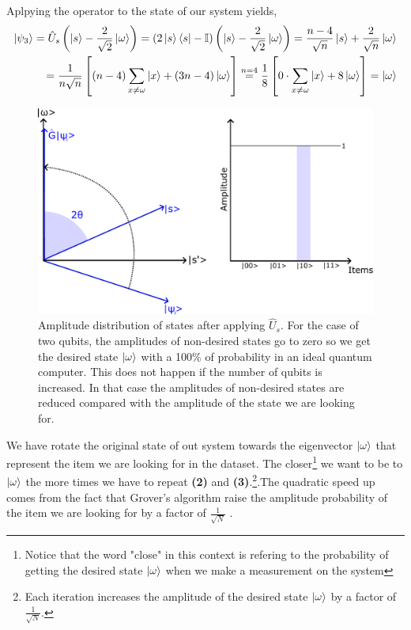 Aplpying the operator to the state of our system yields,
\begin{align*}
    \ket{\psi_{3}} = \hat{U}_{s}\left(\ket{s} -\frac{2}{\sqrt{2}}\ket{\omega}\right) = \left(2\ket{s}\bra{s} - \mathbb{I}\right)\left(\ket{s} - \frac{2}{\sqrt{2}}\ket{\omega}\right) = \frac{n - 4}{\sqrt{n}}\ket{s} + \frac{2}{\sqrt{n}}\ket{\omega} \\
    = \frac{1}{n\sqrt{n}} \left[\left(n - 4\right)\sum_{x\neq \omega}\ket{x} + \left(3n-4\right)\ket{\omega}\right] \overset{n=4}{=} \frac{1}{8} \left[0 \cdot \sum_{x\neq \omega}\ket{x} + 8\ket{\omega}\right] = \ket{\omega}
\end{align*}
\begin{figure}[H]
    \centering
    \includegraphics[scale=0.55]{Figures/Grover_Step3.pdf}
    \caption{Amplitude distribution of states after applying $\hat{U}_{s}$. For the case of two qubits, the amplitudes of non-desired states go to zero so we get the desired state $\ket{\omega}$ with a 100\% of probability in an ideal quantum computer. This does not happen if the number of qubits is increased. In that case the amplitudes of non-desired states are reduced compared with the amplitude of the state we are looking for.}
    \label{fig:Grover_step3}
\end{figure}
\begin{flushleft}
   We have rotate the original state of out system towards the eigenvector $\ket{\omega}$ that represent the item we are looking for in the dataset. The closer\footnote{Notice that the word "close" in this context is refering to the probability of getting the desired state $\ket{\omega}$ when we make a measurement on the system} we want to be to $\ket{\omega}$ the more times we have to repeat \textbf{(2)} and \textbf{(3)}.\footnote{Each iteration increases the amplitude of the desired state $\ket{\omega}$ by a factor of $\frac{1}{\sqrt{N}}$.}.The quadratic speed up comes from the fact that Grover's algorithm raise the amplitude probability of the item we are looking for by a factor of $\frac{1}{\sqrt{N}}$ .
\end{flushleft}


